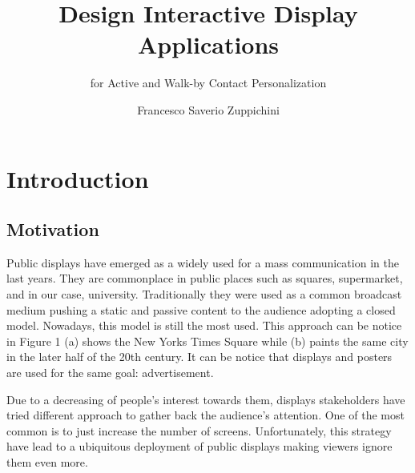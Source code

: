 \documentclass[]{usiinfbachelorproject}
\author{Francesco Saverio Zuppichini}
\title{Design Interactive Display Applications}
\subtitle{for Active and Walk-by Contact Personalization}
\begin{document}
\maketitle

\section{Introduction}
\subsection{Motivation}

Public displays have emerged as a widely used for a mass communication in the last years. They are commonplace in public places such as squares, supermarket, and in our case, university. 
Traditionally they were used as a common broadcast medium pushing a static and passive content to the audience adopting a closed model. Nowadays, this model is still the most used. This approach can be notice in Figure 1 (a) shows the New Yorks Times Square while (b) paints the same city in the later half of the 20th century. It can be notice that displays and posters are used for the same goal: advertisement.

Due to a decreasing of people's interest towards them, displays stakeholders have tried different approach to gather back the audience's attention. One of the most common is to just increase the number of screens. Unfortunately, this strategy have lead to a ubiquitous deployment of public displays making viewers ignore them even more.

\begin{figure}[H]
  \centering
  \hfill
  \caption{}
\end{figure} 
\end{document}
